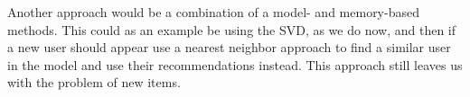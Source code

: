 Another approach would be a combination of a model- and memory-based methods. This could as an example be using the SVD, as we do now, and then if a new user should appear use a nearest neighbor approach to find a similar user in the model and use their recommendations instead. This approach still leaves us with the problem of new items.